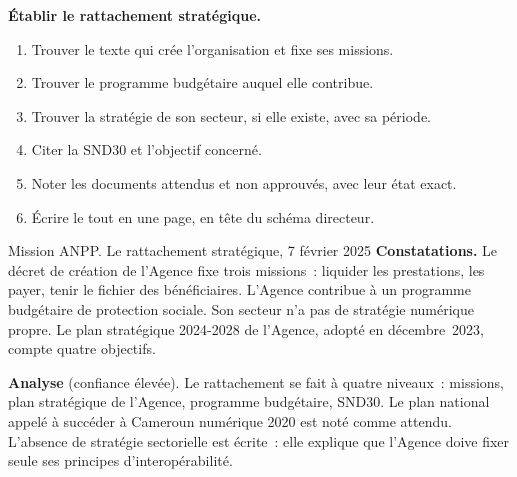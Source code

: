 \begin{boxprocedure}
\textbf{Établir le rattachement stratégique.}
\begin{enumerate}
    \item Trouver le texte qui crée l'organisation et fixe ses missions.
    \item Trouver le programme budgétaire auquel elle contribue.
    \item Trouver la stratégie de son secteur, si elle existe, avec sa période.
    \item Citer la SND30 et l'objectif concerné.
    \item Noter les documents attendus et non approuvés, avec leur état exact.
    \item Écrire le tout en une page, en tête du schéma directeur.
\end{enumerate}
\end{boxprocedure}

\begin{boxscenario}{Mission ANPP. Le rattachement stratégique, 7 février 2025}
\textbf{Constatations.} Le décret de création de l'Agence fixe trois missions~: liquider les prestations, les
payer, tenir le fichier des bénéficiaires. L'Agence contribue à un programme budgétaire de protection sociale.
Son secteur n'a pas de stratégie numérique propre. Le plan stratégique 2024-2028 de l'Agence, adopté en
décembre~2023, compte quatre objectifs.

\textbf{Analyse} (confiance élevée). Le rattachement se fait à quatre niveaux~: missions, plan stratégique de
l'Agence, programme budgétaire, SND30. Le plan national appelé à succéder à Cameroun numérique 2020 est noté comme attendu. L'absence de
stratégie sectorielle est écrite~: elle explique que l'Agence doive fixer seule ses principes d'interopérabilité.
\end{boxscenario}

